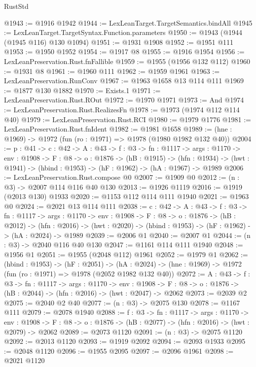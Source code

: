 \begin{lexlean}{RustStd}
\begin{coremodule}
{\begin{coremodule}
@1943 := @1916 @1942
@1944 := LexLeanTarget.TargetSemantics.bindAll
@1945 := LexLeanTarget.TargetSyntax.Function.parameters
@1950 := @1943 (@1944 (@1945 @116) @130 @1094)
@1951 := @1931 @1908
@1952 := @1951 @111
@1953 := @1950 @1952
@1954 := @1917 @8
@1955 := @1916 @1954
@1956 := LexLeanPreservation.Rust.fnFallible
@1959 := @1955 (@1956 @132 @112)
@1960 := @1931 @8
@1961 := @1960 @111
@1962 := @1959 @1961
@1963 := LexLeanPreservation.RunConv
@1967 := @1963 @1658 @13 @114 @111
@1969 := @1877 @130 @1882
@1970 := Exists.{1}
@1971 := LexLeanPreservation.Rust.ROut
@1972 := @1970 @1971
@1973 := And
@1974 := LexLeanPreservation.Rust.RealizesFn
@1978 := @1973 (@1974 @112 @114 @40)
@1979 := LexLeanPreservation.Rust.RCI
@1980 := @1979 @1776
@1981 := LexLeanPreservation.Rust.fnIdent
@1982 := @1981 @1658
@1989 := (hne : @1969) -> @1972 (fun (ro : @1971) => @1978 (@1980 @1982 @132 @40))
@2004 := {p : @41} ->
  {c : @42} ->
  {A : @43} ->
  {f : @3} ->
  {fn : @1117} ->
  {args : @1170} ->
  {env : @1908} ->
  {F : @8} ->
  {o : @1876} ->
  (hB : @1915) ->
  (hfn : @1934) -> (hwt : @1941) -> (hbind : @1953) -> (hF : @1962) -> (hA : @1967) -> @1989
@2006 := LexLeanPreservation.Rust.compose @0
@2007 := @1909 @0
@2012 := (n : @3) -> @2007 @114 @116 @40 @130
@2013 := @1926 @1119
@2016 := @1919 (@2013 @130) @1933
@2020 := @1153 @112 @114 @111 @1940
@2021 := @1963 @0
@2024 := @2021 @13 @114 @111
@2038 := {c : @42} ->
  {A : @43} ->
  {f : @3} ->
  {fn : @1117} ->
  {args : @1170} ->
  {env : @1908} ->
  {F : @8} ->
  {o : @1876} ->
  (hB : @2012) ->
  (hfn : @2016) -> (hwt : @2020) -> (hbind : @1953) -> (hF : @1962) -> (hA : @2024) -> @1989
@2039 := @2006 @1
@2040 := @2007 @1
@2044 := (n : @3) -> @2040 @116 @40 @130
@2047 := @1161 @114 @111 @1940
@2048 := @1956 @1
@2051 := @1955 (@2048 @112) @1961
@2052 := @1979 @1
@2062 := (hbind : @1953) ->
  (hF : @2051) ->
  (hA : @2024) -> (hne : @1969) -> @1972 (fun (ro : @1971) => @1978 (@2052 @1982 @132 @40))
@2072 := {A : @43} ->
  {f : @3} ->
  {fn : @1117} ->
  {args : @1170} ->
  {env : @1908} ->
  {F : @8} -> {o : @1876} -> (hB : @2044) -> (hfn : @2016) -> (hwt : @2047) -> @2062
@2073 := @2039 @2
@2075 := @2040 @2 @40
@2077 := (n : @3) -> @2075 @130
@2078 := @1167 @111
@2079 := @2078 @1940
@2088 := {f : @3} ->
  {fn : @1117} ->
  {args : @1170} ->
  {env : @1908} ->
  {F : @8} -> {o : @1876} -> (hB : @2077) -> (hfn : @2016) -> (hwt : @2079) -> @2062
@2089 := @2073 @1120
@2091 := (n : @3) -> @2075 @1120
@2092 := @2013 @1120
@2093 := @1919 @2092
@2094 := @2093 @1933
@2095 := @2048 @1120
@2096 := @1955 @2095
@2097 := @2096 @1961
@2098 := @2021 @1120

\end{coremodule}}
\end{coremodule}
\end{lexlean}
